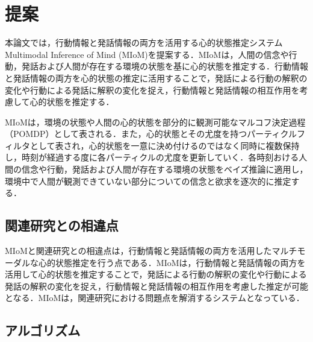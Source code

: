 \chapter{提案}
\par
本論文では，行動情報と発話情報の両方を活用する心的状態推定システムMultimodal Inference of Mind (MIoM)を提案する．MIoMは，人間の信念や行動，発話および人間が存在する環境の状態を基に心的状態を推定する．行動情報と発話情報の両方を心的状態の推定に活用することで，発話による行動の解釈の変化や行動による発話に解釈の変化を捉え，行動情報と発話情報の相互作用を考慮して心的状態を推定する．

\par
MIoMは，環境の状態や人間の心的状態を部分的に観測可能なマルコフ決定過程（POMDP）として表される．また，心的状態とその尤度を持つパーティクルフィルタとして表され，心的状態を一意に決め付けるのではなく同時に複数保持し，時刻が経過する度に各パーティクルの尤度を更新していく．各時刻おける人間の信念や行動，発話および人間が存在する環境の状態をベイズ推論に適用し，環境中で人間が観測できていない部分についての信念と欲求を逐次的に推定する．


\section{関連研究との相違点}
\par
MIoMと関連研究との相違点は，行動情報と発話情報の両方を活用したマルチモーダルな心的状態推定を行う点である．MIoMは，行動情報と発話情報の両方を活用して心的状態を推定することで，発話による行動の解釈の変化や行動による発話の解釈の変化を捉え，行動情報と発話情報の相互作用を考慮した推定が可能となる．MIoMは，関連研究における問題点を解消するシステムとなっている．


\section{アルゴリズム}

